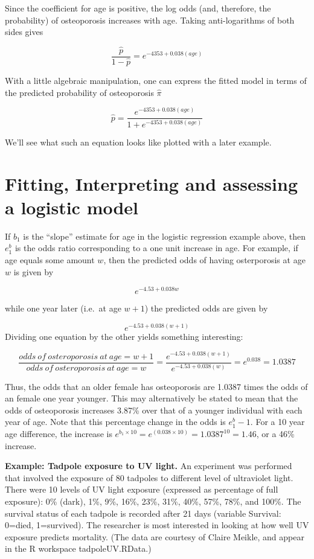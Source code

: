 \documentclass[
]{book}
\begin{document}
Since the coefficient for age is positive, the log odds (and, therefore, the probability) of osteoporosis increases with age. Taking anti-logarithms of both sides gives

\[\frac{\hat{p}}{1-\hat{p}} = e^{-4353 + 0.038(age)}\]

With a little algebraic manipulation, one can express the fitted model in terms of the predicted probability of osteoporosis \(\hat{\pi}\)

\[\hat{p} = \displaystyle\frac{\displaystyle e^{-4353 + 0.038(age)}}{\displaystyle 1+e^{-4353 + 0.038(age)}}\]

We'll see what such an equation looks like plotted with a later example.

\hypertarget{fitting-interpreting-and-assessing-a-logistic-model}{%
\section{Fitting, Interpreting and assessing a logistic model}\label{fitting-interpreting-and-assessing-a-logistic-model}}

If \(b_1\) is the ``slope'' estimate for age in the logistic regression example above, then \(e^b_1\) is the odds ratio corresponding to a one unit increase in age. For example, if age equals some amount \(w\), then the predicted odds of having osterporosis at age \(w\) is given by

\[e^{-4.53 + 0.038w}\]

while one year later (i.e.~at age \(w + 1\)) the predicted odds are given by

\[e^{-4.53 + 0.038(w+1)}\]
Dividing one equation by the other yields something interesting:

\[\frac{odds~of~osteroporosis~at~age=w+1}{odds~of~osteroporosis~at~age=w} = \frac{e^{-4.53 + 0.038(w+1)}}{e^{-4.53 + 0.038(w)}} = e^{0.038} = 1.0387\]

Thus, the odds that an older female has osteoporosis are 1.0387 times the odds of an female one year younger. This may alternatively be stated to mean that the odds of osteoporosis increases 3.87\% over that of a younger individual with each year of age. Note that this percentage change in the odds is \(e^b_1 − 1\). For a 10 year age difference, the increase is \(e^{b_1\times 10} = e^{(0.038\times 10)} = 1.0387^10 = 1.46\), or a 46\% increase.

\textbf{Example: Tadpole exposure to UV light.} An experiment was performed that involved the exposure of 80 tadpoles to different level of ultraviolet light. There were 10 levels of UV light exposure (expressed as percentage of full exposure): 0\% (dark), 1\%, 9\%, 16\%, 23\%, 31\%, 40\%, 57\%, 78\%, and 100\%. The survival status of each tadpole is recorded after 21 days (variable Survival: 0=died, 1=survived). The researcher is most interested in looking at how well UV exposure predicts mortality. (The data are courtesy of Claire Meikle, and appear in the R workspace tadpoleUV.RData.)
\end{document}
